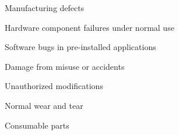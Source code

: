 \documentclass[11pt,a4paper]{article}
\begin{document}
\begin{tbkList}
  \item Manufacturing defects
  \item Hardware component failures under normal use
  \item Software bugs in pre-installed applications
\end{tbkList}


\begin{tbkList}
  \item Damage from misuse or accidents
  \item Unauthorized modifications
  \item Normal wear and tear
  \item Consumable parts
\end{tbkList}


\begin{tbkSpecTable}
\end{tbkSpecTable}


\clearpage
{}

\tbkDocumentInfo

\vspace{2cm}

\tbkCopyright

\vspace{1cm}

\tbkDisclaimer
\end{document}
